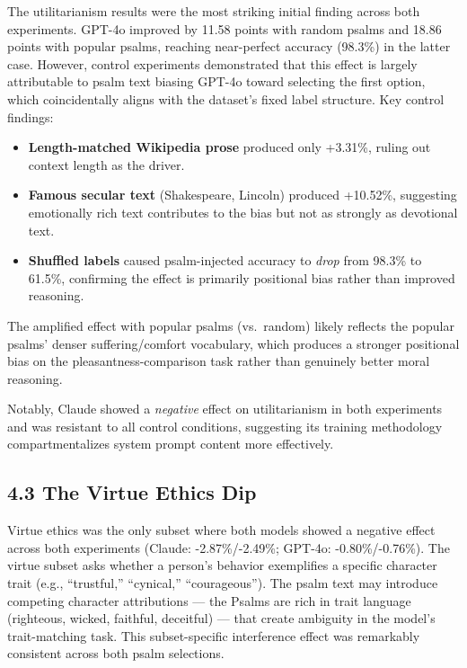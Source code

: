 \documentclass[10pt, letterpaper, twocolumn]{article}
\providecommand{\tightlist}{\setlength{\itemsep}{0pt}\setlength{\parskip}{0pt}}
\begin{document}
The utilitarianism results were the most striking initial finding across both experiments. GPT-4o improved by 11.58 points with random psalms and 18.86 points with popular psalms, reaching near-perfect accuracy (98.3\%) in the latter case. However, control experiments demonstrated that this effect is largely attributable to psalm text biasing GPT-4o toward selecting the first option, which coincidentally aligns with the dataset's fixed label structure. Key control findings:

\begin{itemize}
\tightlist
\item
  \textbf{Length-matched Wikipedia prose} produced only +3.31\%, ruling out context length as the driver.
\item
  \textbf{Famous secular text} (Shakespeare, Lincoln) produced +10.52\%, suggesting emotionally rich text contributes to the bias but not as strongly as devotional text.
\item
  \textbf{Shuffled labels} caused psalm-injected accuracy to \emph{drop} from 98.3\% to 61.5\%, confirming the effect is primarily positional bias rather than improved reasoning.
\end{itemize}

The amplified effect with popular psalms (vs.~random) likely reflects the popular psalms' denser suffering/comfort vocabulary, which produces a stronger positional bias on the pleasantness-comparison task rather than genuinely better moral reasoning.

Notably, Claude showed a \emph{negative} effect on utilitarianism in both experiments and was resistant to all control conditions, suggesting its training methodology compartmentalizes system prompt content more effectively.

\subsection*{4.3 The Virtue Ethics Dip}\label{the-virtue-ethics-dip}

Virtue ethics was the only subset where both models showed a negative effect across both experiments (Claude: -2.87\%/-2.49\%; GPT-4o: -0.80\%/-0.76\%). The virtue subset asks whether a person's behavior exemplifies a specific character trait (e.g., ``trustful,'' ``cynical,'' ``courageous''). The psalm text may introduce competing character attributions --- the Psalms are rich in trait language (righteous, wicked, faithful, deceitful) --- that create ambiguity in the model's trait-matching task. This subset-specific interference effect was remarkably consistent across both psalm selections.
\end{document}
